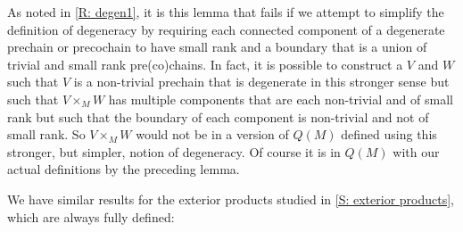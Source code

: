 \begin{remark}\label{R: degen2}
	As noted in \cref{R: degen1}, it is this lemma that fails if we attempt to simplify the definition of degeneracy by requiring each connected component of a degenerate prechain or precochain to have small rank and a boundary that is a union of trivial and small rank pre(co)chains.
	In fact, it is possible to construct a $V$ and $W$ such that $V$ is a non-trivial prechain that is degenerate in this stronger sense but such that $V \times_M W$ has multiple components that are each non-trivial and of small rank but such that the boundary of each component is non-trivial and not of small rank.
	So $V \times_M W$ would not be in a version of $Q(M)$ defined using this stronger, but simpler, notion of degeneracy.
	Of course it is in $Q(M)$ with our actual definitions by the preceding lemma.
\end{remark}


We have similar results for the exterior products studied in \cref{S: exterior products}, which are always fully defined:



